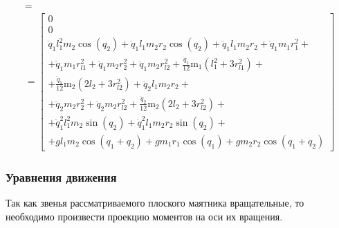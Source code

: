 \documentclass[a4paper,14pt]{extreport}
\begin{document}
\begin{itemize}
\begin{eqnarray}
=\nonumber\\
=
\left[\begin{matrix}0\\0\\
\ddot{q}_1 l_{1}^{2} m_{2} \cos{\left (q_{2} \right )} + \ddot{q}_1 l_{1} m_{2} r_{2} \cos{\left (q_{2} \right )} + \ddot{q}_1 l_{1} m_{2} r_{2} + \ddot{q}_1 m_{1} r_{1}^{2} +\\+
\ddot{q}_1 m_{1} r_{l1}^{2} + \ddot{q}_1 m_{2} r_{2}^{2} + \ddot{q}_1 m_{2} r_{l2}^{2} + \frac{\ddot{q}_1}{12} \operatorname{m_{1}}{\left (l_{1}^{2} + 3 r_{l1}^{2} \right )} +\\+ \frac{\ddot{q}_1}{12} \operatorname{m_{2}}{\left (2 l_{2} + 3 r_{l2}^{2} \right )} + \ddot{q}_2 l_{1} m_{2} r_{2} +\\+
\ddot{q}_2 m_{2} r_{2}^{2} + \ddot{q}_2 m_{2} r_{l2}^{2} + \frac{\ddot{q}_2}{12} \operatorname{m_{2}}{\left (2 l_{2} + 3 r_{l2}^{2} \right )} +\\+
\dot{q}_1^{2} l_{1}^{2} m_{2} \sin{\left (q_{2} \right )} + \dot{q}_1^{2} l_{1} m_{2} r_{2} \sin{\left (q_{2} \right )} +\\+ g l_{1} m_{2} \cos{\left (q_{1} + q_{2} \right )} + g m_{1} r_{1} \cos{\left (q_{1} \right )} + g m_{2} r_{2} \cos{\left (q_{1} + q_{2} \right )}
\end{matrix}\right]\nonumber
\end{eqnarray}
\end{itemize}

\subsubsection{Уравнения движения}

Так как звенья рассматриваемого плоского маятника вращательные, то необходимо произвести проекцию моментов на оси их вращения. 
\end{document}
